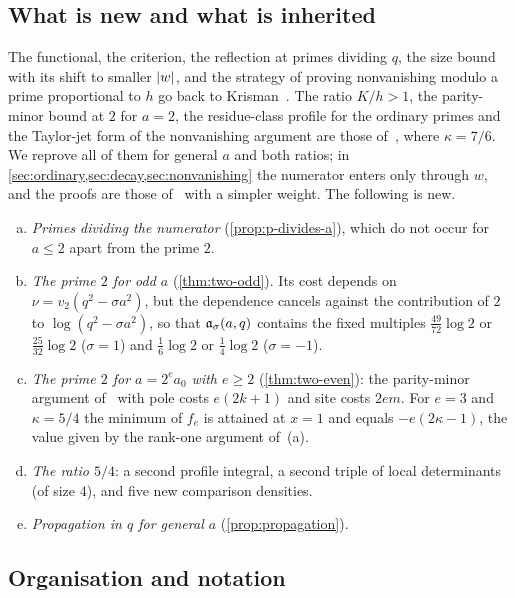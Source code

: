 \subsection{What is new and what is inherited}\label{subsec:new}

The functional, the criterion, the reflection at primes dividing $q$, the size bound with its
shift to smaller $\left\lvert w\right\rvert$, and the strategy of proving nonvanishing modulo a prime proportional
to $h$ go back to Krisman~\cite{Krisman2026chi2}. The ratio $K/h>1$, the parity-minor bound at
$2$ for $a=2$, the residue-class profile for the ordinary primes and the Taylor-jet form of the
nonvanishing argument are those of~\cite{AxiomForge2026numeratorTwo}, where $\kappa=7/6$. We
reprove all of them for general $a$ and both ratios; in
\cref{sec:ordinary,sec:decay,sec:nonvanishing} the numerator enters only through $w$, and the
proofs are those of~\cite{AxiomForge2026numeratorTwo} with a simpler weight. The following is
new.
\begin{enumerate}[(a)]
\item \emph{Primes dividing the numerator} (\cref{prop:p-divides-a}), which do not occur for
$a\le2$ apart from the prime $2$.
\item \emph{The prime $2$ for odd $a$} (\cref{thm:two-odd}). Its cost depends on
$\nu=v_2(q^2-\sigma a^2)$, but the dependence cancels against the contribution of $2$ to
$\log(q^2-\sigma a^2)$, so that $\mathfrak{a}_\sigma(a,q)$ contains the fixed multiples
$\frac{49}{72}\log2$ or $\frac{25}{32}\log2$ ($\sigma=1$) and $\frac16\log2$ or $\frac14\log2$
($\sigma=-1$).
\item \emph{The prime $2$ for $a=2^ea_0$ with $e\ge2$} (\cref{thm:two-even}): the parity-minor
argument of~\cite{AxiomForge2026numeratorTwo} with pole costs $e(2k+1)$ and site costs $2em$.
For $e=3$ and $\kappa=5/4$ the minimum of $f_e$ is attained at $x=1$ and equals $-e(2\kappa-1)$,
the value given by the rank-one argument of~(a).
\item \emph{The ratio $5/4$}: a second profile integral, a second triple of local determinants
(of size $4$), and five new comparison densities.
\item \emph{Propagation in $q$ for general $a$} (\cref{prop:propagation}).
\end{enumerate}

\subsection{Organisation and notation}\label{subsec:notation}

